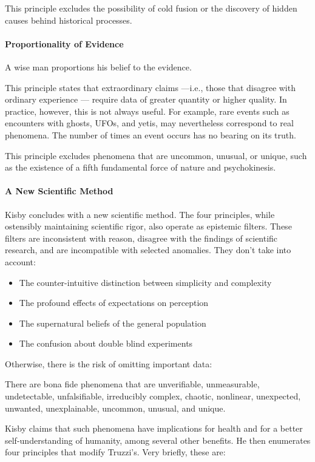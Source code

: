 This principle excludes the possibility of cold fusion or the discovery of hidden causes behind historical processes.

\paragraph{Proportionality of Evidence}
\begin{quotex}
A wise man proportions his belief to the evidence. 

\end{quotex}
This principle states that extraordinary claims —i.e., those that disagree with ordinary experience
— require data of greater quantity or higher quality. In practice, however, this is not always useful. For
example, rare events such as encounters with ghosts, UFOs, and yetis, may nevertheless correspond to real phenomena.
The number of times an event occurs has no bearing on its truth.

This principle excludes phenomena that are uncommon, unusual, or unique, such as the existence of a fifth fundamental
force of nature and psychokinesis.

\paragraph{A New Scientific Method}
Kisby concludes with a new scientific method. The four principles, while ostensibly maintaining scientific rigor, also
operate as epistemic filters. These filters are inconsistent with reason, disagree with the findings of scientific
research, and are incompatible with selected anomalies. They don't take into account:

\begin{itemize}
\item The counter-intuitive distinction between simplicity and complexity 
\item The profound effects of expectations on perception 
\item The supernatural beliefs of the general population 
\item The confusion about double blind experiments 
\end{itemize}
Otherwise, there is the risk of omitting important data:

\begin{quotex}
There are bona fide phenomena that are unverifiable, unmeasurable, undetectable, unfalsifiable, irreducibly complex,
chaotic, nonlinear, unexpected, unwanted, unexplainable, uncommon, unusual, and unique. 

\end{quotex}
Kisby claims that such phenomena have implications for health and for a better self-understanding of humanity, among
several other benefits. He then enumerates four principles that modify Truzzi's. Very briefly, these are:

